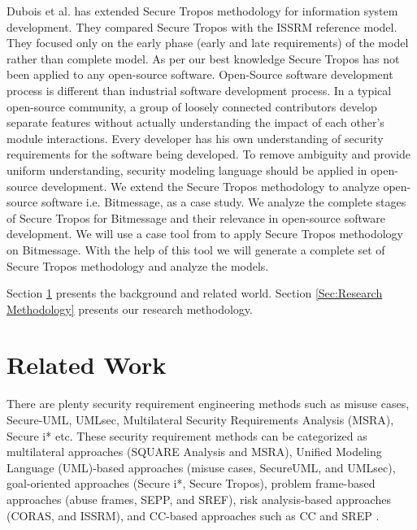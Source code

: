 \documentclass{acm_proc_article-sp}
\begin{document}
\par %
Dubois et al. \cite{citeulike:6509963} has extended Secure Tropos methodology for information system development. They compared Secure Tropos with the ISSRM reference model. They focused only on the early phase (early and late requirements) of the model rather than complete model. As per our best knowledge Secure Tropos has not been applied to any open-source software. Open-Source software development process is different than industrial software development process. In a typical open-source community, a group of loosely connected contributors develop separate features without actually understanding the impact of each other's module interactions. Every developer has his own understanding of security requirements for the software being developed. To remove ambiguity and provide uniform understanding, security modeling language should be applied in open-source development. We extend the Secure Tropos methodology to analyze open-source software i.e. Bitmessage, as a case study. We analyze the complete stages of Secure Tropos for Bitmessage and their relevance in open-source software development. We will use a case tool from \cite{Michalis12} to apply Secure Tropos methodology on Bitmessage. With the help of this tool we will generate a complete set of Secure Tropos methodology and analyze the models.


\par
Section \ref{Sec:Related Work} presents the background and related world. Section \ref{Sec:Research Methodology} presents our research methodology.

%

\section{Related Work}\label{Sec:Related Work}
%
There are plenty security requirement engineering methods such as misuse cases, Secure-UML, UMLsec, Multilateral Security Requirements Analysis (MSRA), Secure i* etc.
These security requirement methods can be categorized as multilateral approaches (SQUARE Analysis and MSRA), Unified Modeling Language (UML)-based approaches (misuse cases, SecureUML, and UMLsec), goal-oriented approaches (Secure i*, Secure Tropos), problem frame-based approaches (abuse frames, SEPP, and SREF), risk analysis-based approaches (CORAS, and ISSRM), and CC-based approaches such as CC and SREP \cite{Husam}.
\end{document}

